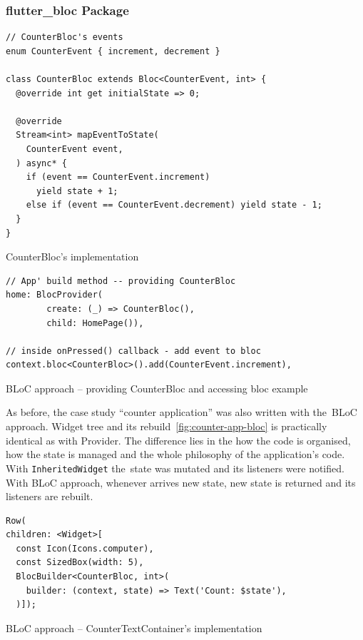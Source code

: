 \subsubsection{flutter\_bloc Package}
\begin{listing}[ht]
\begin{verbatim}
// CounterBloc's events
enum CounterEvent { increment, decrement }

class CounterBloc extends Bloc<CounterEvent, int> {
  @override int get initialState => 0;

  @override
  Stream<int> mapEventToState(
    CounterEvent event,
  ) async* {
    if (event == CounterEvent.increment)
      yield state + 1;
    else if (event == CounterEvent.decrement) yield state - 1;
  }
}
\end{verbatim}
\caption{CounterBloc's implementation}
\label{listing:counter-bloc-bloc}
\end{listing}

\begin{listing}[ht]
\begin{verbatim}
// App' build method -- providing CounterBloc
home: BlocProvider(
        create: (_) => CounterBloc(),
        child: HomePage()),
        
// inside onPressed() callback - add event to bloc
context.bloc<CounterBloc>().add(CounterEvent.increment),
\end{verbatim}
\caption{BLoC approach -- providing CounterBloc and accessing bloc example}
\label{listing:counter-bloc-homepage}
\end{listing}

As before, the case study ``counter application'' was also written with the~BLoC approach. Widget tree and its rebuild~\cref{fig:counter-app-bloc} is practically identical as with Provider. The difference lies in the how the code is organised, how the state is managed and the whole philosophy of the application's code. With \verb|InheritedWidget| the~state was mutated and its listeners were notified. With BLoC approach, whenever arrives new state, new state is returned and its listeners are rebuilt. 

\begin{listing}[ht]
\begin{verbatim}
Row(
children: <Widget>[
  const Icon(Icons.computer),
  const SizedBox(width: 5),
  BlocBuilder<CounterBloc, int>(
    builder: (context, state) => Text('Count: $state'),
  )]);
\end{verbatim}
\caption{BLoC approach -- CounterTextContainer's implementation}
\label{listing:counter-bloc-counter-text}
\end{listing}


